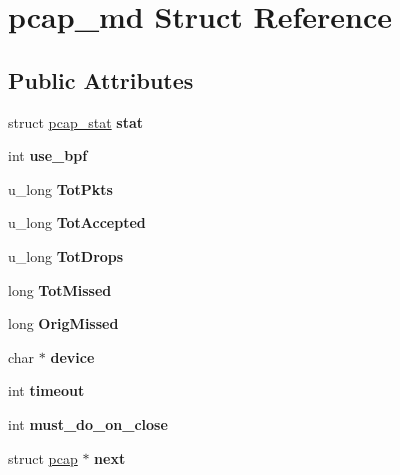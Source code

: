 \hypertarget{structpcap__md}{
\section{pcap\_\-md Struct Reference}
\label{structpcap__md}
}
\subsection*{Public Attributes}
\begin{DoxyCompactItemize}
\item 
\hypertarget{structpcap__md_a6f2384e4ee9448b84bed28d9fde49ad0}{
struct \hyperlink{structpcap__stat}{pcap\_\-stat} {\bfseries stat}}
\label{structpcap__md_a6f2384e4ee9448b84bed28d9fde49ad0}

\item 
\hypertarget{structpcap__md_af698d9edbb699ffb5c617dca4425e1a7}{
int {\bfseries use\_\-bpf}}
\label{structpcap__md_af698d9edbb699ffb5c617dca4425e1a7}

\item 
\hypertarget{structpcap__md_a4398eb19eda6c77389d588089b85389b}{
u\_\-long {\bfseries TotPkts}}
\label{structpcap__md_a4398eb19eda6c77389d588089b85389b}

\item 
\hypertarget{structpcap__md_a4f08602463b3407f431419e94adfa6d1}{
u\_\-long {\bfseries TotAccepted}}
\label{structpcap__md_a4f08602463b3407f431419e94adfa6d1}

\item 
\hypertarget{structpcap__md_accd4f77e5401bf3eb43e9e46e9ac454b}{
u\_\-long {\bfseries TotDrops}}
\label{structpcap__md_accd4f77e5401bf3eb43e9e46e9ac454b}

\item 
\hypertarget{structpcap__md_a7805871ae6e6a362d6b39c5097c3b10a}{
long {\bfseries TotMissed}}
\label{structpcap__md_a7805871ae6e6a362d6b39c5097c3b10a}

\item 
\hypertarget{structpcap__md_ac40dad7f3e6dfa069d3c7caf3f132524}{
long {\bfseries OrigMissed}}
\label{structpcap__md_ac40dad7f3e6dfa069d3c7caf3f132524}

\item 
\hypertarget{structpcap__md_aa914a905d2a2f0de0928b3636c17807f}{
char $\ast$ {\bfseries device}}
\label{structpcap__md_aa914a905d2a2f0de0928b3636c17807f}

\item 
\hypertarget{structpcap__md_a12b684b63748e4fc8f02a4d1e5231c57}{
int {\bfseries timeout}}
\label{structpcap__md_a12b684b63748e4fc8f02a4d1e5231c57}

\item 
\hypertarget{structpcap__md_a58d8d485a2fc808173c0c7d3d6568c4a}{
int {\bfseries must\_\-do\_\-on\_\-close}}
\label{structpcap__md_a58d8d485a2fc808173c0c7d3d6568c4a}

\item 
\hypertarget{structpcap__md_ad55cd6860596e87f5bf1b4b373003dc9}{
struct \hyperlink{structpcap}{pcap} $\ast$ {\bfseries next}}
\label{structpcap__md_ad55cd6860596e87f5bf1b4b373003dc9}

\end{DoxyCompactItemize}


